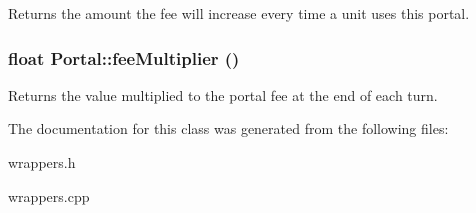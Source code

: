 Returns the amount the fee will increase every time a unit uses this portal. \hypertarget{classPortal_64b431284d20f1d04a3f9a4192482f5d}{
\subsubsection[{feeMultiplier}]{\setlength{\rightskip}{0pt plus 5cm}float Portal::feeMultiplier ()}}
\label{classPortal_64b431284d20f1d04a3f9a4192482f5d}


Returns the value multiplied to the portal fee at the end of each turn. 

The documentation for this class was generated from the following files:\begin{CompactItemize}
\item 
wrappers.h\item 
wrappers.cpp\end{CompactItemize}
